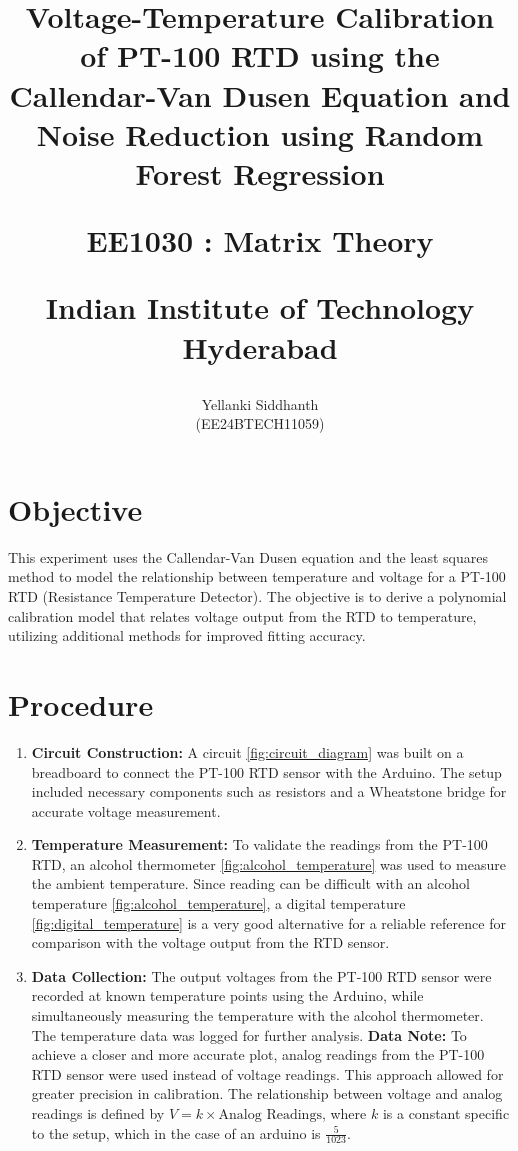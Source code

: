 \documentclass[journal,onecolumn]{IEEEtran}
\begin{document}
	\title{
			\fontsize{18pt}{20pt}\selectfont Voltage-Temperature Calibration of PT-100 RTD using the Callendar-Van Dusen Equation and Noise Reduction using Random Forest Regression
			
			\large{EE1030 : Matrix Theory}
			
			Indian Institute of Technology Hyderabad
	}
	\author{Yellanki Siddhanth
		
		(EE24BTECH11059)
	}	
	\maketitle
	\section{Objective}
	This experiment uses the Callendar-Van Dusen equation and the least squares method to model the relationship between temperature and voltage for a PT-100 RTD (Resistance Temperature Detector). The objective is to derive a polynomial calibration model that relates voltage output from the RTD to temperature, utilizing additional methods for improved fitting accuracy.
	\section{Procedure}
	\begin{enumerate}
		\item \textbf{Circuit Construction:} A circuit \ref{fig:circuit_diagram} was built on a breadboard to connect the PT-100 RTD sensor with the Arduino. The setup included necessary components such as resistors and a Wheatstone bridge for accurate voltage measurement. 
		
		\item \textbf{Temperature Measurement:} To validate the readings from the PT-100 RTD, an alcohol thermometer \ref{fig:alcohol_temperature} was used to measure the ambient temperature. Since reading can be difficult with an alcohol temperature \ref{fig:alcohol_temperature}, a digital temperature \ref{fig:digital_temperature} is a very good alternative for a reliable reference for comparison with the voltage output from the RTD sensor.
		
		\item \textbf{Data Collection:} The output voltages from the PT-100 RTD sensor were recorded at known temperature points using the Arduino, while simultaneously measuring the temperature with the alcohol thermometer. The temperature data was logged for further analysis. \textbf{Data Note:} To achieve a closer and more accurate plot, analog readings from the PT-100 RTD sensor were used instead of voltage readings. This approach allowed for greater precision in calibration. The relationship between voltage and analog readings is defined by \( V = k \times \text{Analog Readings} \), where \( k \) is a constant specific to the setup, which in the case of an arduino is $\frac{5}{1023}$.
		
	\end{enumerate}
	
\end{document}

